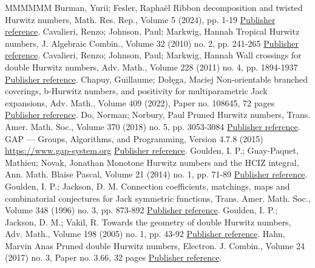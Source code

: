 \begin{thebibliography}{MMMMMM}
 Burman, Yurii; Fesler, Raphaël Ribbon decomposition and twisted Hurwitz numbers, Math. Res. Rep., Volume 5 (2024), pp. 1-19 \href{https://alco.centre-mersenne.org/articles/10.5802/alco.368/#BF21}{Publisher reference}.
 Cavalieri, Renzo; Johnson, Paul; Markwig, Hannah Tropical Hurwitz numbers, J. Algebraic Combin., Volume 32 (2010) no. 2, pp. 241-265 \href{https://alco.centre-mersenne.org/articles/10.5802/alco.368/#CJM10}{Publisher reference}.
 Cavalieri, Renzo; Johnson, Paul; Markwig, Hannah Wall crossings for double Hurwitz numbers, Adv. Math., Volume 228 (2011) no. 4, pp. 1894-1937 \href{https://alco.centre-mersenne.org/articles/10.5802/alco.368/#CJM11}{Publisher reference}.
 Chapuy, Guillaume; Dołęga, Maciej Non-orientable branched coverings, b-Hurwitz numbers, and positivity for multiparametric Jack expansions, Adv. Math., Volume 409 (2022), Paper no. 108645, 72 pages \href{https://alco.centre-mersenne.org/articles/10.5802/alco.368/#chapuy2020non}{Publisher reference}.
 Do, Norman; Norbury, Paul Pruned Hurwitz numbers, Trans. Amer. Math. Soc., Volume 370 (2018) no. 5, pp. 3053-3084 \href{https://alco.centre-mersenne.org/articles/10.5802/alco.368/#do2018pruned}{Publisher reference}.
 GAP — Groups, Algorithms, and Programming, Version 4.7.8 (2015) \url{https://www.gap-system.org} \href{https://alco.centre-mersenne.org/articles/10.5802/alco.368/#GAP4}{Publisher reference}.
 Goulden, I. P.; Guay-Paquet, Mathieu; Novak, Jonathan Monotone Hurwitz numbers and the HCIZ integral, Ann. Math. Blaise Pascal, Volume 21 (2014) no. 1, pp. 71-89 \href{https://alco.centre-mersenne.org/articles/10.5802/alco.368/#goulden2014monotone}{Publisher reference}.
 Goulden, I. P.; Jackson, D. M. Connection coefficients, matchings, maps and combinatorial conjectures for Jack symmetric functions, Trans. Amer. Math. Soc., Volume 348 (1996) no. 3, pp. 873-892 \href{https://alco.centre-mersenne.org/articles/10.5802/alco.368/#goulden1996connection}{Publisher reference}.
 Goulden, I. P.; Jackson, D. M.; Vakil, R. Towards the geometry of double Hurwitz numbers, Adv. Math., Volume 198 (2005) no. 1, pp. 43-92 \href{https://alco.centre-mersenne.org/articles/10.5802/alco.368/#GJV05}{Publisher reference}.
 Hahn, Marvin Anas Pruned double Hurwitz numbers, Electron. J. Combin., Volume 24 (2017) no. 3, Paper no. 3.66, 32 pages \href{https://alco.centre-mersenne.org/articles/10.5802/alco.368/#zbMATH06791415}{Publisher reference}.

\end{thebibliography}
